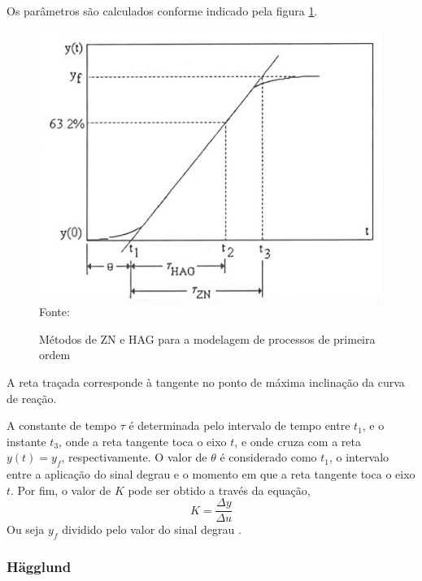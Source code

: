 Os parâmetros são calculados conforme indicado pela figura \ref{fig:zn_hg_ident_meth}.
\begin{figure}[H]
    \centering
    \caption{Métodos de ZN e HAG para a modelagem de processos de primeira ordem}
    \includegraphics[scale=0.3]{figuras/zn_hg_ident_meth}
    \label{fig:zn_hg_ident_meth}
    \\
    \vspace{0cm}\hspace{0cm}\small{Fonte: \cite{CoelhoIdentificacao}}
\end{figure}

A reta traçada corresponde à tangente no ponto de máxima inclinação da curva de reação.

A constante de tempo $\tau$ é determinada pelo intervalo de tempo entre $t_1$, e o instante
$t_3$, onde a reta tangente toca o eixo $t$, e onde cruza com a reta $y(t) = y_f$,
respectivamente.
O valor de  $\theta$ é considerado como $t_1$, o intervalo entre a aplicação do sinal degrau e o
momento em que a reta tangente toca o eixo $t$.
Por fim, o valor de $K$ pode ser obtido a través da equação,
\begin{equation}
    \label{eq:dydu}
    K = \frac{\Delta y}{\Delta u}
\end{equation}
Ou seja $y_f$ dividido pelo valor do sinal degrau \cite{CoelhoIdentificacao}.

\subsubsection{Hägglund}\label{subsubsec:hagfun}

